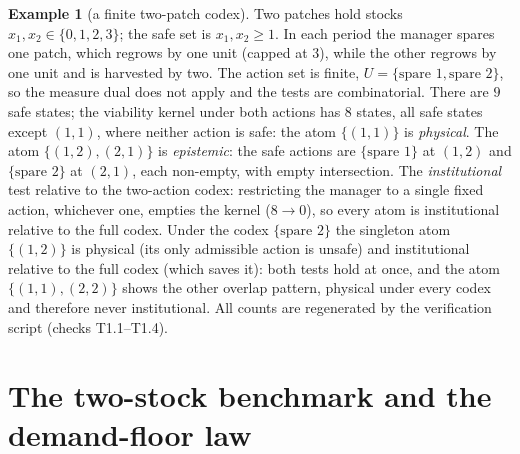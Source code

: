 \documentclass[11pt,a4paper]{article}
\theoremstyle{plain}
\theoremstyle{definition}
\newtheorem{example}[theorem]{Example}
\theoremstyle{remark}
\begin{document}
\begin{example}[a finite two-patch codex]\label{ex:patch}
Two patches hold stocks $x_1,x_2\in\{0,1,2,3\}$; the safe set is $x_1,x_2\ge1$. In each period the manager spares one patch, which regrows by one unit (capped at $3$), while the other regrows by one unit and is harvested by two. The action set is finite, $U=\{\text{spare }1,\text{spare }2\}$, so the measure dual does not apply and the tests are combinatorial. There are $9$ safe states; the viability kernel under both actions has $8$ states, all safe states except $(1,1)$, where neither action is safe: the atom $\{(1,1)\}$ is \emph{physical}. The atom $\{(1,2),(2,1)\}$ is \emph{epistemic}: the safe actions are $\{\text{spare }1\}$ at $(1,2)$ and $\{\text{spare }2\}$ at $(2,1)$, each non-empty, with empty intersection. The \emph{institutional} test relative to the two-action codex: restricting the manager to a single fixed action, whichever one, empties the kernel ($8\to0$), so every atom is institutional relative to the full codex. Under the codex $\{\text{spare }2\}$ the singleton atom $\{(1,2)\}$ is physical (its only admissible action is unsafe) and institutional relative to the full codex (which saves it): both tests hold at once, and the atom $\{(1,1),(2,2)\}$ shows the other overlap pattern, physical under every codex and therefore never institutional. All counts are regenerated by the verification script (checks T1.1--T1.4).
\end{example}
\section{The two-stock benchmark and the demand-floor law}\label{sec:benchmark}
\end{document}
